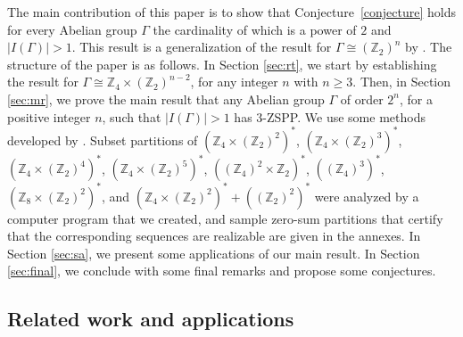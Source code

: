 \documentclass[final]{dmtcs-episciences}
\newcommand{\zet}{\mathbb{Z}}
\begin{document}
The main contribution of this paper is to show that Conjecture~\ref{conjecture} holds for every Abelian group $\Gamma$ the cardinality of which is a power of $2$ and $|I(\Gamma)|>1$. This result is a generalization of the result for $\Gamma\cong(\zet_2)^n$ by \citet{ref:CaccJia,Egawa,Tannenbaum2}. The structure of the paper is as follows.
In Section \ref{sec:rt}, we start by establishing the result for $\Gamma\cong \zet_4\times(\zet_2)^{n-2}$, for any integer $n$ with $n \geq 3$. Then, in Section \ref{sec:mr}, we prove the main result that any Abelian group $\Gamma$ of order $2^n$, for a positive integer $n$, such that $|I(\Gamma)|>1$ has $3$-ZSPP. We use some methods developed by \citet{Egawa,Zeng}. Subset partitions of
$\left(\zet_4\times(\zet_2)^{2}\right)^*$, $\left(\zet_4\times(\zet_2)^{3}\right)^*$, $\left(\zet_4\times(\zet_2)^{4}\right)^*$, $\left(\zet_4\times(\zet_2)^{5}\right)^*$,
$\left((\zet_4)^{2}\times\zet_2\right)^*$,
$\left((\zet_4)^{3}\right)^*$,
$\left(\zet_8\times(\zet_2)^{2}\right)^*$, 
and $\left(\zet_4\times(\zet_2)^{2}\right)^*+\left((\zet_2)^{2}\right)^*$
were analyzed by a computer program that we created, and sample zero-sum partitions that certify that the corresponding sequences are realizable are given in the annexes. In Section \ref{sec:sa}, we present some applications of our main result. In Section \ref{sec:final}, we conclude with some final remarks and propose some conjectures. 


\subsection{Related work and applications}\label{subsec:rw}
\end{document}
